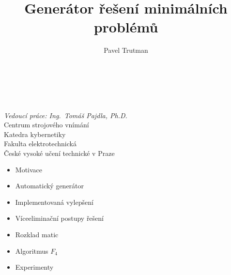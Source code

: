 \documentclass[cmpiitalkstyle, 25pt]{cmptalk}
\author{Pavel Trutman}
\affiliation{Centrum strojového vnímání}
\title{Generátor řešení minimálních problémů}
\begin{document}
\bigfigfalse
\begin{talktitlepage}
  \mbox{}\\
  {\Large\bfseries \thetitle }\\[\baselineskip]
  \theauthor \\[\baselineskip]
  \textit{Vedoucí práce: Ing.\ Tomáš Pajdla, Ph.D.}
  \vfill
  \thetalklogo\\[1cm]
  Centrum strojového vnímání\\
  Katedra kybernetiky\\
  Fakulta elektrotechnická\\
  České vysoké učení technické v Praze
  \vspace{2cm}
\end{talktitlepage}

\begin{cmptalkslide}[Obsah]
  \begin{itemize}
    \item Motivace
    \item Automatický generátor
    \item Implementovaná vylepšení
    \end{itemize}
    \begin{narrow}[2]
    \begin{itemize}
      \item Víceeliminační postupy řešení
      \item Rozklad matic
      \item Algoritmus $F_4$
    \end{itemize}
    \end{narrow}
    \begin{itemize}
    \item Experimenty
  \end{itemize}
\end{cmptalkslide}
\end{document}
